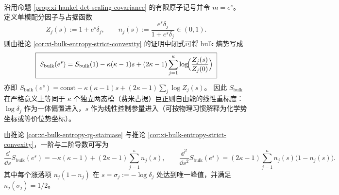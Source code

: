 
\begin{remark}\label{rem:xi-bulk-entropy-fermi-grand-canonical}
沿用命题 \ref{prop:xi-hankel-det-scaling-covariance} 的有限原子记号并令 \(m=e^s\)。
定义单模配分因子与占据函数
\[
Z_j(s):=1+e^{s}\delta_j,
\qquad
n_j(s):=\frac{e^{s}\delta_j}{1+e^{s}\delta_j}\in(0,1).
\]
则由推论 \ref{cor:xi-bulk-entropy-strict-convexity} 的证明中闭式可将 bulk 熵势写成
\[
\boxed{\;
S_{\mathrm{bulk}}(e^{s})
=S_{\mathrm{bulk}}(1)-\kappa(\kappa-1)s
+(2\kappa-1)\sum_{j=1}^{\kappa}\log\!\Bigl(\frac{Z_j(s)}{Z_j(0)}\Bigr)\;}
\]
亦即
\(
S_{\mathrm{bulk}}(e^{s})=\mathrm{const}-\kappa(\kappa-1)s+(2\kappa-1)\sum_j\log Z_j(s)
\)。
因此 \(S_{\mathrm{bulk}}\) 在严格意义上等同于 \(\kappa\) 个独立两态模（费米占据）巨正则自由能的线性重标度：\(\log\delta_j\) 作为一体偏置进入，\(s\) 作为线性控制参量进入（可按物理习惯解释为化学势坐标或等价位势坐标）。
\par
由推论 \ref{cor:xi-bulk-entropy-rg-staircase} 与推论 \ref{cor:xi-bulk-entropy-strict-convexity}，一阶与二阶导数可写为
\[
\frac{\dd}{\dd s}S_{\mathrm{bulk}}(e^s)=-\kappa(\kappa-1)+(2\kappa-1)\sum_{j=1}^{\kappa}n_j(s),
\qquad
\frac{\dd^2}{\dd s^2}S_{\mathrm{bulk}}(e^s)=(2\kappa-1)\sum_{j=1}^{\kappa}n_j(s)\bigl(1-n_j(s)\bigr).
\]
其中每个涨落项 \(n_j(1-n_j)\) 在 \(s=\sigma_j:=-\log\delta_j\) 处达到唯一峰值，并满足 \(n_j(\sigma_j)=1/2\)。
\end{remark}

